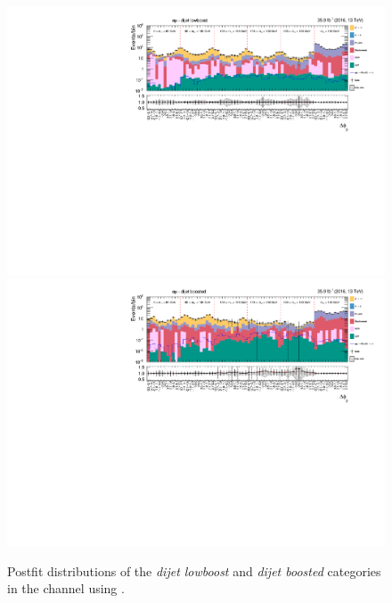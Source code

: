 \begin{figure}[h!]
    \centering
        \includegraphics[width=\textwidth]{Figures/statana/Postfit_JEC_jdphi/postfit_fit_s_htt_em_3_13TeV.pdf}\\
        \includegraphics[width=\textwidth]{Figures/statana/Postfit_JEC_jdphi/postfit_fit_s_htt_em_4_13TeV.pdf}
    \caption{Postfit distributions of the \textit{dijet lowboost} and \textit{dijet boosted} categories in the \emu{} channel  using \jdphi{}.}\label{SUPPLE:SA:postfit_em_2jet}
\end{figure}
\clearpage
